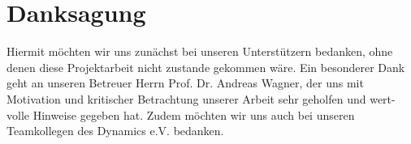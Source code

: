 \chapter*{Danksagung}
\vfill
\par Hiermit möchten wir uns zunächst bei unseren Unterstützern bedanken, ohne denen
diese Projektarbeit nicht zustande gekommen wäre. \vspace{1em}
Ein besonderer Dank geht an unseren Betreuer Herrn Prof. Dr. Andreas Wagner, der
uns mit Motivation und kritischer Betrachtung unserer Arbeit sehr geholfen und wert-
volle Hinweise gegeben hat.  \vspace{1em}
Zudem möchten wir uns auch bei unseren Teamkollegen des Dynamics e.V. bedanken.
\vspace{4em}
